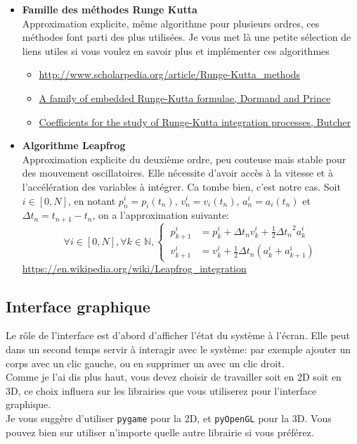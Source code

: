 \documentclass{article}
\begin{document}
\begin{itemize}
    \item \textbf{Famille des méthodes Runge Kutta} \\
    Approximation explicite, même algorithme pour plusieurs ordres, ces méthodes font parti des plus utilisées. Je vous met là une petite sélection de liens utiles si vous voulez en savoir plus et implémenter ces algorithmes
    \begin{itemize}
        \item \url{http://www.scholarpedia.org/article/Runge-Kutta_methods}
        \item \href{https://core.ac.uk/download/pdf/81989096.pdf}{A family of embedded Runge-Kutta formulae, Dormand and Prince}
        \item \href{https://www.researchgate.net/publication/231910159_Coefficients_for_the_study_of_Runge-Kutta_integration_processes}{Coefficients for the study of Runge-Kutta integration processes, Butcher}
    \end{itemize}


    \item \textbf{Algorithme Leapfrog} \\
    Approximation explicite du deuxième ordre, peu couteuse mais stable pour des mouvement oscillatoires. Elle nécessite d'avoir accès à la vitesse et à l'accélération des variables à intégrer. Ca tombe bien, c'est notre cas. Soit $i \in [0,N]$, en notant $p^i_n = p_i(t_n)$, $v^i_n = v_i(t_n)$, $a^i_n = a_i(t_n)$ et $\Delta t_n = t_{n+1} - t_n$, on a l'approximation suivante:
    \begin{equation*}
        \forall i \in [0,N], \forall k \in \mathbb{N}, \left\{\begin{aligned}
            \ p^i_{k+1} & = p^i_k + \Delta t_n v^i_k + \frac{1}{2}{\Delta t_n}^2 a^i_k\\
            \ v^i_{k+1} & = v^i_k + \frac{1}{2}\Delta t_n(a^i_k + a^i_{k+1})
        \end{aligned}\right.
    \end{equation*}
    \url{https://en.wikipedia.org/wiki/Leapfrog_integration}
\end{itemize}

\subsection{Interface graphique}
\label{interface}

Le rôle de l'interface est d'abord d'afficher l'état du système à l'écran. Elle peut dans un second temps servir à interagir avec le système: par exemple ajouter un corps avec un clic gauche, ou en supprimer un avec un clic droit.\\
Comme je l'ai dis plus haut, vous devez choisir de travailler soit en 2D soit en 3D, ce choix influera sur les librairies que vous utiliserez pour l'interface graphique.\\
Je vous suggère d'utiliser \verb!pygame! pour la 2D, et \verb!pyOpenGL! pour la 3D. Vous pouvez bien sur utiliser n'importe quelle autre librairie si vous préférez.
\end{document}
